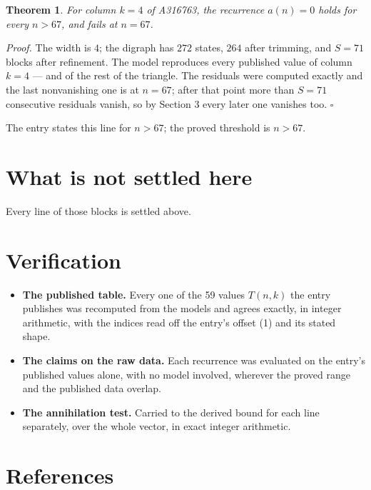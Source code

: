 \documentclass[11pt]{article}
\newtheorem{theorem}{Theorem}
\theoremstyle{definition}
\begin{document}
\begin{theorem} For column $k = 4$ of A316763, the recurrence $a(n) = 0$ holds for every $n > 67$, and fails at $n = 67$.\end{theorem}

{\itshape Proof.} The width is $4$; the digraph has $272$ states, $264$ after trimming, and $S = 71$ blocks after refinement. The model reproduces every published value of column $k = 4$ --- and of the rest of the triangle. The residuals were computed exactly and the last nonvanishing one is at $n = 67$; after that point more than $S = 71$ consecutive residuals vanish, so by Section 3 every later one vanishes too. $\square$

The entry states this line for $n > 67$; the proved threshold is $n > 67$.

\section{What is not settled here}

Every line of those blocks is settled above.

\section{Verification}

\begin{itemize}

\item {\bfseries The published table.} Every one of the 59 values $T(n,k)$ the entry publishes was recomputed from the models and agrees exactly, in integer arithmetic, with the indices read off the entry's offset (1) and its stated shape.

\item {\bfseries The claims on the raw data.} Each recurrence was evaluated on the entry's published values alone, with no model involved, wherever the proved range and the published data overlap.

\item {\bfseries The annihilation test.} Carried to the derived bound for each line separately, over the whole vector, in exact integer arithmetic.

\end{itemize}

\section{References}
\end{document}
